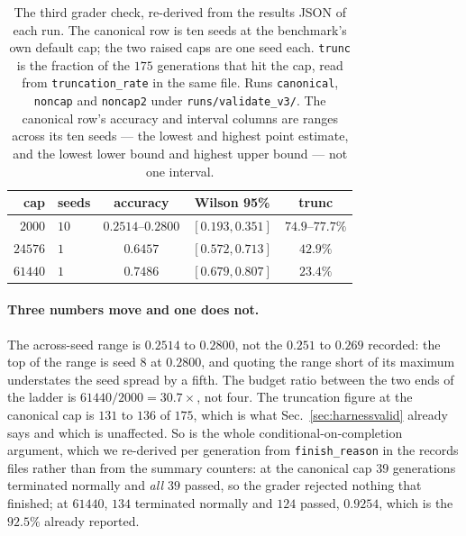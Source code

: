 \begin{table}[t]
\centering\small
\caption{The third grader check, re-derived from the results JSON of each run. The canonical
row is ten seeds at the benchmark's own default cap; the two raised caps are one seed each.
\texttt{trunc} is the fraction of the $175$ generations that hit the cap, read from
\texttt{truncation\_rate} in the same file. Runs \texttt{canonical}, \texttt{noncap} and
\texttt{noncap2} under \texttt{runs/validate\_v3/}. The canonical row's accuracy and interval
columns are ranges across its ten seeds --- the lowest and highest point estimate, and the
lowest lower bound and highest upper bound --- not one interval.}
\label{tab:capfix}
\begin{tabular}{rlccc}
\toprule
cap & seeds & accuracy & Wilson 95\% & trunc \\
\midrule
$2000$   & $10$ & $0.2514$--$0.2800$ & $[0.193, 0.351]$ & $74.9$--$77.7\%$ \\
$24576$  & $1$  & $0.6457$           & $[0.572, 0.713]$ & $42.9\%$ \\
$61440$  & $1$  & $0.7486$           & $[0.679, 0.807]$ & $23.4\%$ \\
\bottomrule
\end{tabular}
\end{table}

\paragraph{Three numbers move and one does not.} The across-seed range is $0.2514$ to
$0.2800$, not the $0.251$ to $0.269$ recorded: the top of the range is seed $8$ at $0.2800$,
and quoting the range short of its maximum understates the seed spread by a fifth. The budget
ratio between the two ends of the ladder is $61440/2000 = 30.7\times$, not four. The
truncation figure at the canonical cap is $131$ to $136$ of $175$, which is what
Sec.~\ref{sec:harnessvalid} already says and which is unaffected. So is the whole
conditional-on-completion argument, which we re-derived per generation from
\texttt{finish\_reason} in the records files rather than from the summary counters: at the
canonical cap $39$ generations terminated normally and \emph{all $39$} passed, so the grader
rejected nothing that finished; at $61440$, $134$ terminated normally and $124$ passed,
$0.9254$, which is the $92.5\%$ already reported.

